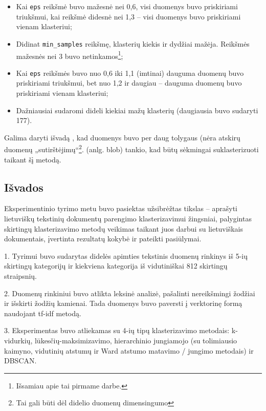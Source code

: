 \documentclass{VUMIFInfKursinis}
\begin{document}
\begin{itemize}
\item
  Kai \texttt{eps} reikšmė
  buvo mažesnė nei 0,6, visi duomenys buvo
  priskiriami triukšmui, kai
  reikšmė didesnė nei 1,3 – visi duomenys
  buvo priskiriami vienam klasteriui;
\item
  Didinat \texttt{min\_samples} reikšmę,
  klasterių kiekis ir dydžiai mažėja. Reikšmės
  mažesnės nei 3 buvo netinkamos\footnote{Išsamiau
    apie tai pirmame darbe.};
\item
  Kai \texttt{eps} reikšmės
  buvo nuo 0,6 iki 1,1 (imtinai)
  dauguma duomenų buvo priskiriami
  triukšmui, bet nuo 1,2 ir daugiau –
  dauguma duomenų buvo priskiriami
  vienam klasteriui;
\item
  Dažniausiai sudaromi dideli kiekiai mažų klasterių
  (daugiausia buvo sudaryti 177).
\end{itemize}

Galima daryti išvadą , kad duomenys
buvo per daug tolygaus (nėra atskirų
duomenų „sutirštėjimų“\footnote{Tai
  gali būti dėl didelio duomenų dimensingumo}. 
(anlg. blob) tankio, kad būtų sėkmingai
suklasterizuoti taikant šį
metodą.











\subsection{Išvados}

Eksperimentinio tyrimo metu buvo pasiektas užsibrėžtas tikslas –
aprašyti lietuviškų tekstinių dokumentų parengimo klasterizavimui
žingsniai, palygintas skirtingų klasterizavimo metodų veikimas taikant
juos darbui su lietuviškais dokumentais, įvertinta rezultatų kokybė ir
pateikti pasiūlymai.

1. Tyrimui buvo sudarytas didelės apimties tekstinis duomenų rinkinys iš
5-ių skirtingų kategorijų ir kiekviena kategorija iš vidutiniškai 812
skirtingų straipsnių.

2. Duomenų rinkiniui buvo atlikta leksinė analizė, pašalinti
nereikšmingi žodžiai ir išskirti žodžių kamienai. Tada duomenys buvo
paversti į verktorinę formą naudojant tf-idf metodą.

3. Eksperimentas buvo atliekamas su 4-ių tipų klasterizavimo metodais:
k-vidurkių, lūkesčių-maksimizavimo, hierarchinio jungiamojo
(su tolimiausio kaimyno,
vidutinių atstumų ir Ward
atstumo matavimo / jungimo metodais) ir
DBSCAN.
\end{document}
